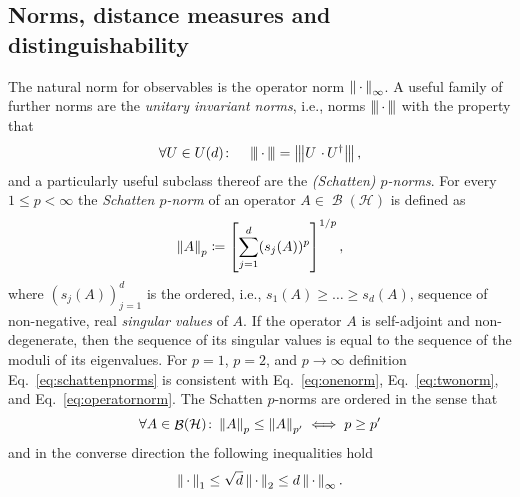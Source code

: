 \documentclass[a4paper,12pt,listof=totoc,index=totoc,bibliography=totoc,headsepline=false,headings=normal,BCOR16.153846mm,DIV12,headinclude,twoside,cleardoublepage=empty,numbers=noenddot,final]{scrreprt}
\theoremstyle{mystyle}
\numberwithin{equation}{section}
\numberwithin{figure}{section}
\numberwithin{lemma}{section}
\numberwithin{theorem}{section}
\numberwithin{corollary}{section}
\numberwithin{definition}{section}
\numberwithin{conjecture}{section}
\numberwithin{observation}{section}
\newcommand{\+}{\mkern2mu}
\newcommand{\coloneqq}{\mathrel{\vcentcolon\mkern-1.2mu=}} %
\newcommand{\texteqref}[1]{Eq.~\eqref{#1}}
\newcommand{\argdot}{{\,\cdot\,}}
\newcommand{\itholds}{\colon\mathchoice{\quad}{}{}{}}
\newcommand{\norm}[2][]{
  \ifthenelse{\equal{#1}{}}
    {\left\| {#2} \right\|}
    {\ifthenelse{\equal{#1}{uinv}}
      {\left\vert\kern-0.25ex\left\vert\kern-0.25ex\left\vert {#2} \right\vert\kern-0.25ex\right\vert\kern-0.25ex\right\vert}
      {\left\| {#2} \right\|_{#1}}
    }
}
\newcommand{\ad}{^\dagger}
\DeclareMathOperator{\1}{\mathds{1}}
\DeclareMathOperator{\Bop}{\mathcal{B}}
\newcommand{\mc}[1]{\mathcal{#1}}
\newcommand{\mcH}{\mc{H}}
\begin{document}
\subsection{Norms, distance measures and distinguishability}
\label{sec:normsanddistancemeasures}
%
The natural norm for observables is the operator norm $\norm[\infty]\argdot$.
A useful family of further norms are the \emph{unitary invariant norms}, i.e., norms $\norm[uinv]\argdot$ with the property that 
\begin{equation}
  \forall U \in U(d)\itholds \norm[uinv]{\argdot} = \norm[uinv]{U\,\argdot U\ad} ,
\end{equation}
and a particularly useful subclass thereof are the \emph{(Schatten) $p$-norms}. 
For every $1\leq p<\infty$ the \emph{Schatten $p$-norm} of an operator $A \in \Bop(\mcH)$ is defined as \cite{bhatia}
\begin{equation} \label{eq:schattenpnorms}
  \norm[p]A \coloneqq \left[\sum_{j=1}^d (s_j(A))^p \right]^{1/p} ,
\end{equation} 
where $(s_j(A))_{j=1}^d$ is the ordered, i.e., $s_1(A) \geq \dots \geq s_d(A)$, sequence of non-negative, real \emph{singular values} of $A$.
If the operator $A$ is self-adjoint and non-degenerate, then the sequence of its singular values is equal to the sequence of the moduli of its eigenvalues.
For $p=1$, $p=2$, and $p\to\infty$ definition \texteqref{eq:schattenpnorms} is consistent with \texteqref{eq:onenorm}, \texteqref{eq:twonorm}, and \texteqref{eq:operatornorm}.
The Schatten $p$-norms are ordered in the sense that \cite{bhatia}
\begin{equation}
  \forall A\in\Bop(\mcH)\colon \norm[p]A \leq \norm[p']A \iff p\geq p' 
\end{equation}
and in the converse direction the following inequalities hold \cite{bhatia}
\begin{equation}
  \norm[1]\argdot \leq \sqrt{d} \norm[2]\argdot \leq d \norm[\infty]\argdot .
\end{equation}
\end{document}
